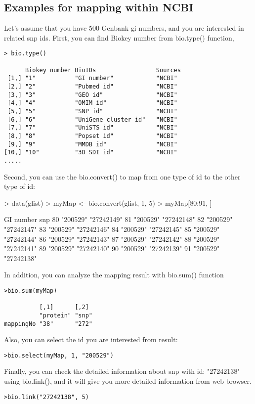 \documentclass[a4paper]{article}
\begin{document}
\subsection{Examples for mapping within NCBI}
Let's assume that  you have 500 Genbank gi numbers, and you are interested in related snp ids. \newline
First, you can find Biokey number from bio.type() function,
\begin{verbatim}
> bio.type()

      Biokey number BioIDs                 Sources   
 [1,] "1"           "GI number"            "NCBI"    
 [2,] "2"           "Pubmed id"            "NCBI"    
 [3,] "3"           "GEO id"               "NCBI"    
 [4,] "4"           "OMIM id"              "NCBI"    
 [5,] "5"           "SNP id"               "NCBI"    
 [6,] "6"           "UniGene cluster id"   "NCBI"    
 [7,] "7"           "UniSTS id"            "NCBI"    
 [8,] "8"           "Popset id"            "NCBI"    
 [9,] "9"           "MMDB id"              "NCBI"    
[10,] "10"          "3D SDI id"            "NCBI" 
.....
\end{verbatim}
Second, you can use the bio.convert() to map from one type of id to the other type of id:
\begin{Schunk}
\begin{Sinput}
> data(glist)
> myMap <- bio.convert(glist, 1, 5)
> myMap[80:91, ]
\end{Sinput}
\begin{Soutput}
   GI number snp       
80 "200529"  "27242149"
81 "200529"  "27242148"
82 "200529"  "27242147"
83 "200529"  "27242146"
84 "200529"  "27242145"
85 "200529"  "27242144"
86 "200529"  "27242143"
87 "200529"  "27242142"
88 "200529"  "27242141"
89 "200529"  "27242140"
90 "200529"  "27242139"
91 "200529"  "27242138"
\end{Soutput}
\end{Schunk}
In addition, you can analyze the mapping result with bio.sum() function
\begin{verbatim}
>bio.sum(myMap)

          [,1]      [,2]
          "protein" "snp"
mappingNo "38"      "272"
\end{verbatim}
Also, you can select the id you are interested from result:
 \begin{verbatim}
>bio.select(myMap, 1, "200529")
\end{verbatim}
Finally, you can check the detailed information about snp with id: "27242138" using bio.link(), and it will give you more detailed information from web browser.
\begin{verbatim}
>bio.link("27242138", 5)
\end{verbatim}
\end{document}

